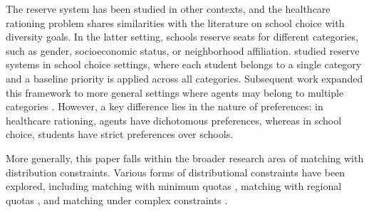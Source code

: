 The reserve system has been studied in other contexts, and the healthcare rationing problem shares similarities with the literature on school choice with diversity goals. In the latter setting, schools reserve seats for different categories, such as gender, socioeconomic status, or neighborhood affiliation. \citet{HYY13a, EHYY14a} studied reserve systems in school choice settings, where each student belongs to a single category and a baseline priority is applied across all categories. Subsequent work expanded this framework to more general settings where agents may belong to multiple categories \citep{ BCC+19a, CEE+19a, KHIY17a, GNKR19a, Aziz19b, AGS20a}. However, a key difference lies in the nature of preferences: in healthcare rationing, agents have dichotomous preferences, whereas in school choice, students have strict preferences over schools.


More generally, this paper falls within the broader research area of matching with distribution constraints. Various forms of distributional constraints have been explored, including matching with minimum quotas \citep{BFIM10a, HHKS+17a}, matching with regional quotas \citep{KaKo15a, GKH+15a, KaKo17a, GIKY+16a}, and matching under complex constraints \citep{KTY18a,KaKo23a}.


